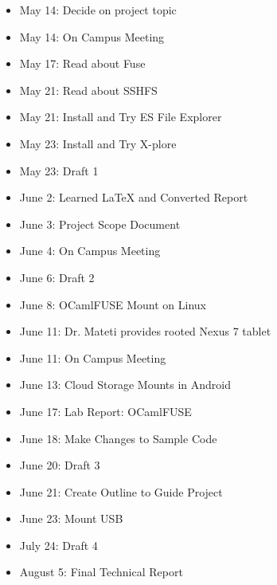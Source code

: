 \begin{itemize}
  \item May 14: Decide on project topic
  \item May 14: On Campus Meeting
  \item May 17: Read about Fuse
  \item May 21: Read about SSHFS
  \item May 21: Install and Try ES File Explorer
  \item May 23: Install and Try X-plore
  \item May 23: Draft 1
  \item June 2: Learned LaTeX and Converted Report
  \item June 3: Project Scope Document
  \item June 4: On Campus Meeting
  \item June 6: Draft 2
  \item June 8: OCamlFUSE Mount on Linux
  \item June 11: Dr. Mateti provides rooted Nexus 7 tablet
  \item June 11: On Campus Meeting
  \item June 13: Cloud Storage Mounts in Android
  \item June 17: Lab Report: OCamlFUSE
  \item June 18: Make Changes to Sample Code
  \item June 20: Draft 3
  \item June 21: Create Outline to Guide Project
  \item June 23: Mount USB
  \item July 24: Draft 4
  \item August 5: Final Technical Report
\end{itemize}

